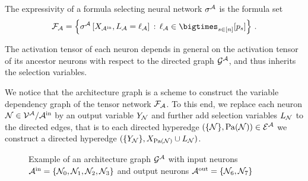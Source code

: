 \begin{definition}
    The expressivity of a formula selecting neural network $\sigma^{\mathcal{A}}$ is the formula set
    \begin{align*}
        \formulasetof{\larchitecture} = \left\{ \fsnnat{\catvariableof{\inneuronset},\indexedselvariableof{\larchitecture}}  \wcols \selindexof{\larchitecture}\in\selstates \right\} \, .
    \end{align*}

\end{definition}

The activation tensor of each neuron depends in general on the activation tensor of its ancestor neurons with respect to the directed graph $\mathcal{G}^{\mathcal{A}}$, and thus inherits the selection variables.

We notice that the architecture graph is a scheme to construct the variable dependency graph of the tensor network $\mathcal{F}_{\mathcal{A}}$.
To this end, we replace each neuron $\mathcal{N}\in\mathcal{V}^{\mathcal{A}}/\mathcal{A}^{\mathrm{in}}$ by an output variable $Y_{\mathcal{N}}$ and further add selection variables $L_{\mathcal{N}}$ to the directed edges, that is to each directed hyperedge $(\{\mathcal{N}\}, \mathrm{Pa}(\mathcal{N}))\in\mathcal{E}^{\mathcal{A}}$ we construct a directed hyperedge $(\{Y_{\mathcal{N}}\}, X_{\mathrm{Pa}(\mathcal{N})}\cup L_{\mathcal{N}})$.

\begin{figure}[t]
    \begin{center}
        
    \end{center}
    \caption{Example of an architecture graph $\mathcal{G}^{\mathcal{A}}$ with input neurons $\mathcal{A}^{\mathrm{in}}=\{\mathcal{N}_{0},\mathcal{N}_{1},\mathcal{N}_{2},\mathcal{N}_{3}\}$ and output neurons $\mathcal{A}^{\mathrm{out}}=\{\mathcal{N}_{6},\mathcal{N}_{7}\}$
    }
    \label{fig:architectureGraph}
\end{figure}


